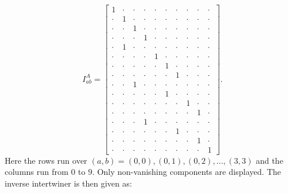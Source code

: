 \documentclass[a4paper,12pt, DIV=14, BCOR=5mm, twoside, headsepline, numbers=noenddot]{scrbook}
\begin{document}
\begin{equation}\label{interIMet}
I^A_{ab} = \begin{bmatrix}
                1 & \cdot & \cdot & \cdot & \cdot & \cdot & \cdot & \cdot & \cdot & \cdot \\
                \cdot & 1 & \cdot & \cdot & \cdot & \cdot & \cdot & \cdot & \cdot & \cdot \\
                \cdot & \cdot & 1 & \cdot & \cdot & \cdot & \cdot & \cdot & \cdot & \cdot \\
                \cdot & \cdot & \cdot & 1 & \cdot & \cdot & \cdot & \cdot & \cdot & \cdot \\
                \cdot & 1 & \cdot & \cdot & \cdot & \cdot & \cdot & \cdot & \cdot & \cdot \\
                \cdot & \cdot & \cdot & \cdot & 1 & \cdot & \cdot & \cdot & \cdot & \cdot \\
                \cdot & \cdot & \cdot & \cdot & \cdot & 1 & \cdot & \cdot & \cdot & \cdot \\
                \cdot & \cdot & \cdot & \cdot & \cdot & \cdot & 1 & \cdot & \cdot & \cdot \\
                \cdot & \cdot & 1 & \cdot & \cdot & \cdot & \cdot & \cdot & \cdot & \cdot  \\
                \cdot & \cdot & \cdot & \cdot & \cdot & 1 & \cdot & \cdot & \cdot & \cdot  \\
                \cdot & \cdot & \cdot & \cdot & \cdot & \cdot & \cdot & 1 & \cdot & \cdot\\
                \cdot & \cdot & \cdot & \cdot & \cdot & \cdot & \cdot & \cdot & 1 & \cdot \\
                \cdot & \cdot & \cdot & 1 & \cdot & \cdot & \cdot & \cdot & \cdot & \cdot \\
                \cdot & \cdot & \cdot & \cdot & \cdot & \cdot & 1 & \cdot & \cdot & \cdot \\
                \cdot & \cdot & \cdot & \cdot & \cdot & \cdot & \cdot & \cdot & 1 & \cdot \\
                \cdot & \cdot & \cdot & \cdot & \cdot & \cdot & \cdot & \cdot & \cdot & 1 
            \end{bmatrix}.
\end{equation}
Here the rows run over $(a,b)={(0,0),(0,1),(0,2),...,(3,3)}$ and the columns run from $0$ to $9$. Only non-vanishing components are displayed. The inverse intertwiner is then given as: 
\end{document}

